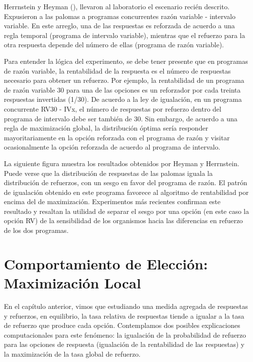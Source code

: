 \documentclass[
  a4paper,
  DIV=11,
  numbers=noendperiod]{scrreprt}
\begin{document}
Herrnstein y Heyman (), llevaron al laboratorio el escenario recién
descrito. Expusieron a las palomas a programas concurrentes razón
variable - intervalo variable. En este arreglo, una de las respuestas es
reforzada de acuerdo a una regla temporal (programa de intervalo
variable), mientras que el refuerzo para la otra respuesta depende del
número de ellas (programa de razón variable).

Para entender la lógica del experimento, se debe tener presente que en
programas de razón variable, la rentabilidad de la respuesta es el
número de respuestas necesario para obtener un refuerzo. Por ejemplo, la
rentabilidad de un programa de razón variable 30 para una de las
opciones es un reforzador por cada treinta respuestas invertidas (1/30).
De acuerdo a la ley de igualación, en un programa concurrente RV30 -
IVx, el número de respuestas por refuerzo dentro del programa de
intervalo debe ser también de 30. Sin embargo, de acuerdo a una regla de
maximización global, la distribución óptima sería responder
mayoritariamente en la opción reforzada con el programa de razón y
visitar ocasionalmente la opción reforzada de acuerdo al programa de
intervalo.

La siguiente figura muestra los resultados obtenidos por Heyman y
Herrnstein. Puede verse que la distribución de respuestas de las palomas
iguala la distribución de refuerzos, con un sesgo en favor del programa
de razón. El patrón de igualación obtenido en este programa favorece al
algoritmo de rentabilidad por encima del de maximización. Experimentos
más recientes confirman este resultado y resaltan la utilidad de separar
el sesgo por una opción (en este caso la opción RV) de la sensibilidad
de los organismos hacia las diferencias en refuerzo de los dos
programas.


\chapter{Comportamiento de Elección: Maximización
Local}\label{comportamiento-de-elecciuxf3n-maximizaciuxf3n-local}

En el capítulo anterior, vimos que estudiando una medida agregada de
respuestas y refuerzos, en equilibrio, la tasa relativa de respuestas
tiende a igualar a la tasa de refuerzo que produce cada opción.
Contemplamos dos posibles explicaciones computacionales para este
fenómeno: la igualación de la probabilidad de refuerzo para las opciones
de respuesta (igualación de la rentabilidad de las respuestas) y la
maximización de la tasa global de refuerzo.
\end{document}

